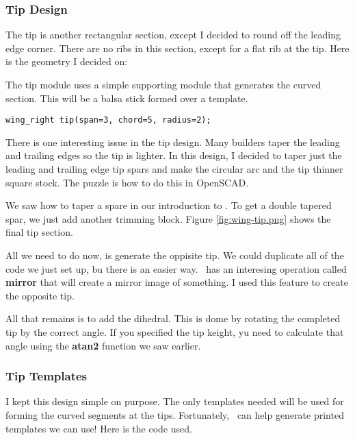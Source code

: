 
\subsubsection{Tip Design}

The tip is another rectangular section, except I decided to round off the
leading edge corner. There are no ribs in this section, except for a flat rib
at the tip. Here is the geometry I decided on:


The tip module uses a simple supporting module that generates the curved section.
This will be a balsa stick formed over a template.

\begin{lstlisting}
wing_right tip(span=3, chord=5, radius=2);
\end{lstlisting}

There is one interesting issue in the tip design. Many builders taper the
leading and trailing edges so the tip is lighter. In this design, I decided to
taper just the leading and trailing edge tip spars and make the circular arc
and the tip thinner square stock. The puzzle is how to do this in OpenSCAD.

We saw how to taper a spare in our introduction to \osc. To get a double
tapered spar, we just add another trimming block.  Figure
\ref{fig:wing-tip.png} shows the final tip section.


All we need to do now, is generate the oppisite tip. We could duplicate all of
the code we just set up, bu there is an easier way. \osc\ has an interesing
operation called {\bf mirror} that will create a mirror image of something. I
used this feature to create the opposite tip.

All that remains is to add the dihedral. This is dome by rotating the completed
tip by the correct angle. If you specified the tip keight, yu need to calculate
that angle using the {\bf atan2} function we saw earlier.


\subsubsection{Tip Templates}

I kept this design simple on purpose. The only templates needed will be used
for forming the curved segments at the tips. Fortunately, \osc\ can help
generate printed templates we can use! Here is the code used.

